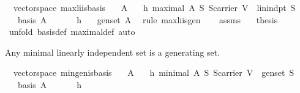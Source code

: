 \begin{isabellebody}
\begin{isamarkuptext}
\end{isamarkuptext}%
\isamarkuptrue%
\isamarkupfalse%
\ {\isacharparenleft}\ vectorspace{\isacharparenright}\ max{\isacharunderscore}li{\isacharunderscore}is{\isacharunderscore}basis{\isacharcolon}\isanewline
\ \ \ A\isanewline
\ \ \ h{}{\isacharcolon}\ {\isachardoublequoteopen}maximal\ A\ {\isacharparenleft}{\isasymlambda}S{\isachardot}\ S{\isasymsubseteq}carrier\ V\ {\isasymand}\ lin{\isacharunderscore}indpt\ S{\isacharparenright}{\isachardoublequoteclose}\isanewline
\ \ \ {\isachardoublequoteopen}basis\ A{\isachardoublequoteclose}\isanewline
%
\isadelimproof
%
\endisadelimproof
%
\isatagproof
{}\isamarkupfalse%
\ {\isacharminus}\ \isanewline
\ \ \isamarkupfalse%
\ h{}\ \isamarkupfalse%
\ {}{\isacharcolon}\ {\isachardoublequoteopen}gen{\isacharunderscore}set\ A{\isachardoublequoteclose}\ \isamarkupfalse%
\ {\isacharparenleft}rule\ max{\isacharunderscore}li{\isacharunderscore}is{\isacharunderscore}gen{\isacharparenright}\isanewline
\ \ \isamarkupfalse%
\ assms\ {}\ \isamarkupfalse%
\ {\isacharquery}thesis\ \isamarkupfalse%
\ {\isacharparenleft}unfold\ basis{\isacharunderscore}def\ maximal{\isacharunderscore}def{\isacharcomma}\ auto{\isacharparenright}\isanewline
{}\isamarkupfalse%
%
\endisatagproof
{\isafoldproof}%
%
\isadelimproof
%
\endisadelimproof
%
\begin{isamarkuptext}%
Any minimal linearly independent set is a generating set.%
\end{isamarkuptext}%
\isamarkuptrue%
\isamarkupfalse%
\ {\isacharparenleft}\ vectorspace{\isacharparenright}\ min{\isacharunderscore}gen{\isacharunderscore}is{\isacharunderscore}basis{\isacharcolon}\isanewline
\ \ \ A\isanewline
\ \ \ h{}{\isacharcolon}\ {\isachardoublequoteopen}minimal\ A\ {\isacharparenleft}{\isasymlambda}S{\isachardot}\ S{\isasymsubseteq}carrier\ V\ {\isasymand}\ gen{\isacharunderscore}set\ S{\isacharparenright}{\isachardoublequoteclose}\isanewline
\ \ \ {\isachardoublequoteopen}basis\ A{\isachardoublequoteclose}\isanewline
%
\isadelimproof
%
\endisadelimproof
%
\isatagproof
{}\isamarkupfalse%
\ {\isacharminus}\ \isanewline
\ \ \isamarkupfalse%
\ h{}\ \isamarkupfalse%

\end{isabellebody}
